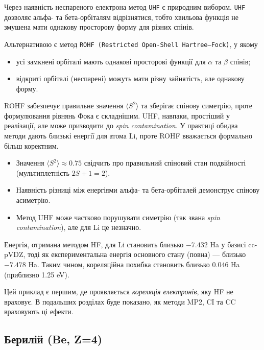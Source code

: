 Через наявність неспареного електрона метод \texttt{UHF} є природним вибором.
\texttt{UHF} дозволяє альфа- та бета-орбіталям відрізнятися, тобто хвильова функція не змушена мати однакову просторову форму для різних спінів.

Альтернативою є метод \texttt{ROHF (Restricted Open-Shell Hartree–Fock)}, у якому
\begin{itemize}
    \item усі замкнені орбіталі мають однакові просторові функції для $\alpha$ та $\beta$ спінів;
    \item відкриті орбіталі (неспарені) можуть мати різну зайнятість, але однакову форму.
\end{itemize}
ROHF забезпечує правильне значення $\langle S^2 \rangle$ та зберігає спінову симетрію, проте формулювання рівнянь Фока є складнішим.
UHF, навпаки, простіший у реалізації, але може призводити до \textit{spin contamination}.
У практиці обидва методи дають близькі енергії для атома Li, проте ROHF вважається формально більш коректним.


\begin{commentbox}
\begin{itemize}
  \item Значення \(\langle S^2 \rangle \approx 0.75\) свідчить про правильний спіновий стан подвійності (мультиплетність \(2S+1=2\)).
  \item Наявність різниці між енергіями альфа- та бета-орбіталей демонструє спінову асиметрію.
  \item Метод UHF може частково порушувати симетрію (так звана \textit{spin contamination}), але для Li це незначно.
\end{itemize}

Енергія, отримана методом HF, для Li становить близько \(-7.432\) Ha у базисі cc-pVDZ, тоді як експериментальна енергія основного стану (повна) --- близько \(-7.478\) Ha.
Таким чином, кореляційна похибка становить близько \(0.046\) Ha (приблизно 1.25 eV).
\end{commentbox}

Цей приклад є першим, де проявляється \emph{кореляція електронів}, яку HF не враховує. В подальших розділах буде показано, як методи MP2, CI та CC враховують ці ефекти.

\subsection{Берилій (Be, Z=4)}

